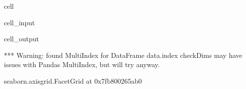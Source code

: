 \documentclass[letterpaper,table,10pt,english]{jupyterBook}
\begin{document}
\begin{sphinxuseclass}{cell}\begin{sphinxVerbatimInput}

\begin{sphinxuseclass}{cell_input}
\begin{sphinxVerbatim}[commandchars=\\\{\}]
  
     
                 
                     
\end{sphinxVerbatim}

\end{sphinxuseclass}\end{sphinxVerbatimInput}
\begin{sphinxVerbatimOutput}

\begin{sphinxuseclass}{cell_output}
\begin{sphinxVerbatim}[commandchars=\\\{\}]
*** Warning: found MultiIndex for DataFrame data.index \PYGZhy{} checkDims may have issues with Pandas MultiIndex, but will try anyway.
\end{sphinxVerbatim}

\begin{sphinxVerbatim}[commandchars=\\\{\}]
\PYGZlt{}seaborn.axisgrid.FacetGrid at 0x7fb800265ab0\PYGZgt{}
\end{sphinxVerbatim}

\noindent{}

\end{sphinxuseclass}\end{sphinxVerbatimOutput}

\end{sphinxuseclass}
\end{document}
